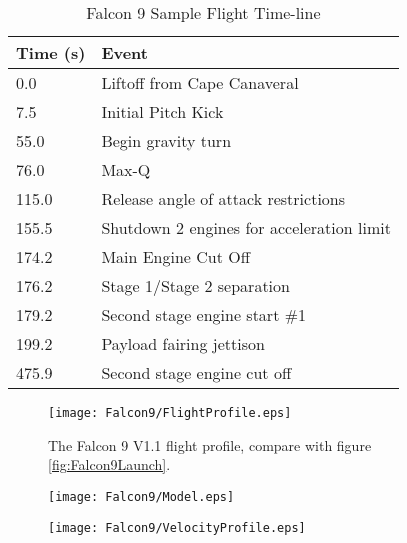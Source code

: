 \begin{table}[!htb]
\centering
\begin{tabular}{|l|l|}
\hline
\rowcolor[HTML]{C0C0C0} 
Time (s) & Event                                     \\ \hline
0.0      & Liftoff from Cape Canaveral               \\ \hline
\rowcolor[HTML]{EFEFEF} 
7.5      & Initial Pitch Kick                        \\ \hline
55.0     & Begin gravity turn                        \\ \hline
\rowcolor[HTML]{EFEFEF} 
76.0     & Max-Q                                     \\ \hline
115.0    & Release angle of attack restrictions      \\ \hline
\rowcolor[HTML]{EFEFEF} 
155.5    & Shutdown 2 engines for acceleration limit \\ \hline
174.2    & Main Engine Cut Off                       \\ \hline
\rowcolor[HTML]{EFEFEF} 
176.2    & Stage 1/Stage 2 separation                \\ \hline
179.2    & Second stage engine start \#1             \\ \hline
\rowcolor[HTML]{EFEFEF} 
199.2    & Payload fairing jettison                  \\ \hline
475.9    & Second stage engine cut off               \\ \hline
\end{tabular}
\caption{Falcon 9 Sample Flight Time-line \cite{Falcon9}}
\label{tab:Falcon9Timeline}
\end{table}

\begin{figure}[!htb] 
    \centering
    \texttt{[image: Falcon9/FlightProfile.eps]} 
    \caption{The Falcon 9 V1.1 flight profile, compare with figure \ref{fig:Falcon9Launch}.}
    \label{fig:Faclon9FlightProfile}
\end{figure}


\begin{figure}[!htb] 
    \centering
    \texttt{[image: Falcon9/Model.eps]}
    \caption{}
    \label{fig:Falcon9Model}
\end{figure}


\begin{figure}[!htb] 
    \centering
    \texttt{[image: Falcon9/VelocityProfile.eps]}
    \caption{}
    \label{fig:Falcon9VelocityProfile}
\end{figure}



